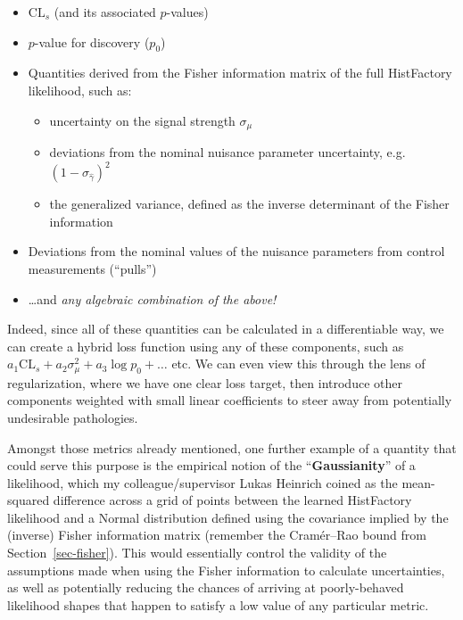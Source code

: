 \documentclass[
  11pt,
  numbers=noendperiod]{book}
\providecommand{\tightlist}{%
  \setlength{\itemsep}{0pt}\setlength{\parskip}{0pt}}\usepackage{longtable,booktabs,array}
\begin{document}
\begin{itemize}
\tightlist
\item
  \(\mathrm{CL}_s\) (and its associated \(p\)-values)
\item
  \(p\)-value for discovery (\(p_0\))
\item
  Quantities derived from the Fisher information matrix of the full
  HistFactory likelihood, such as:

  \begin{itemize}
  \tightlist
  \item
    uncertainty on the signal strength \(\sigma_{\mu}\)
  \item
    deviations from the nominal nuisance parameter uncertainty,
    e.g.~\((1-\sigma_{\hat{\gamma}})^2\)
  \item
    the generalized variance, defined as the inverse determinant of the
    Fisher information
  \end{itemize}
\item
  Deviations from the nominal values of the nuisance parameters from
  control measurements (``pulls'')
\item
  \ldots and \emph{any algebraic combination of the above!}
\end{itemize}

Indeed, since all of these quantities can be calculated in a
differentiable way, we can create a hybrid loss function using any of
these components, such as
\(a_1 \mathrm{CL}_s + a_2\sigma_{\mu}^2 + a_3\log{p_0} + \dots\) etc. We
can even view this through the lens of regularization, where we have one
clear loss target, then introduce other components weighted with small
linear coefficients to steer away from potentially undesirable
pathologies.

Amongst those metrics already mentioned, one further example of a
quantity that could serve this purpose is the empirical notion of the
``\textbf{Gaussianity}'' of a likelihood, which my colleague/supervisor
Lukas Heinrich coined as the mean-squared difference across a grid of
points between the learned HistFactory likelihood and a Normal
distribution defined using the covariance implied by the (inverse)
Fisher information matrix (remember the Cramér--Rao bound from
Section~\ref{sec-fisher}). This would essentially control the validity
of the assumptions made when using the Fisher information to calculate
uncertainties, as well as potentially reducing the chances of arriving
at poorly-behaved likelihood shapes that happen to satisfy a low value
of any particular metric.
\end{document}
